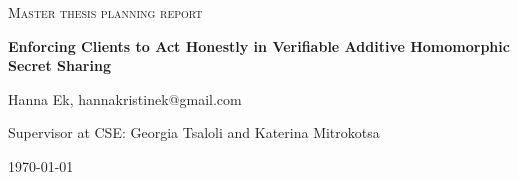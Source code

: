 

\centering
  
  
{\scshape\LARGE Master thesis planning report\\}
  
\vspace{0.5cm}
  
{\huge\bfseries Enforcing Clients to Act Honestly in Verifiable Additive Homomorphic Secret Sharing\\}
  
\vspace{2cm}
  
{\Large Hanna Ek, hannakristinek@gmail.com\\}
  
\vspace{0.2cm}
  
  
\vspace{1.0cm}
  
{\large Supervisor at CSE: Georgia Tsaloli and Katerina Mitrokotsa\\}
  
\vspace{1.5cm}

  
\vspace{1.5cm}


  
\vspace{1.5cm}

\vfill

  

\vfill
  
{\large \today\\} 


